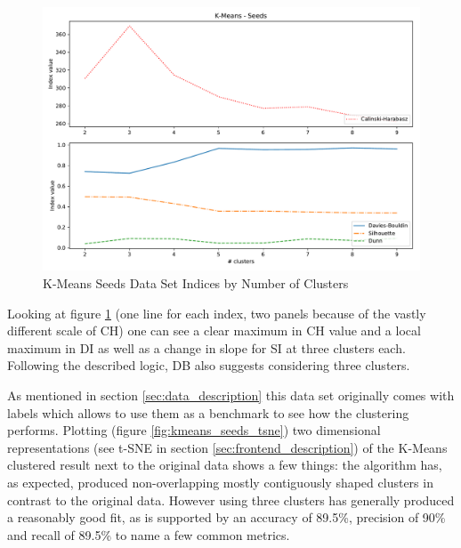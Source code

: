 \begin{figure}[H]
\begin{center}
\includegraphics[width=1.0\textwidth]{images/kmeans_seeds_index_plot.pdf}
\caption{K-Means Seeds Data Set Indices by Number of Clusters}
\end{center}
\label{fig:kmeans_seeds_comparison_plot}
\end{figure}

\vspace{-0.5cm}
Looking at figure \ref{fig:kmeans_seeds_comparison_plot} (one line for each index, two panels because of the vastly different scale of \gls{CH}) one can see a clear maximum in \gls{CH} value and a local maximum in \gls{DI} as well as a change in slope for \gls{SI} at three clusters each. Following the described logic, \gls{DB} also suggests considering three clusters. 

As mentioned in section \ref{sec:data_description} this data set originally comes with labels which allows to use them as a benchmark to see how the clustering performs. Plotting (figure \ref{fig:kmeans_seeds_tsne}) two dimensional representations (see t-SNE in section \ref{sec:frontend_description}) of the K-Means clustered result next to the original data shows a few things: the algorithm has, as expected, produced non-overlapping mostly contiguously shaped clusters in contrast to the original data. However using three clusters has generally produced a reasonably good fit, as is supported by an accuracy of 89.5\%, precision of 90\% and recall of 89.5\% to name a few common metrics.

